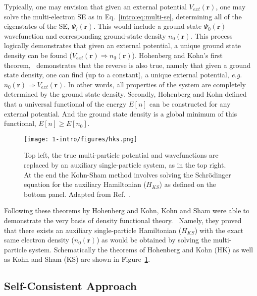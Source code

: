 Typically, one may envision that given an external potential $V_{ext}(\textbf{r})$, one may solve the multi-electron SE as in Eq.~\ref{intro:eq:multi-se}, determining all of the eigenstates of the SE, $\Psi_i({\textbf{r}})$. This would include a ground state $\Psi_0({\textbf{r}})$ wavefunction and corresponding ground-state density $n_0(\textbf{r})$. This process logically demonstrates that given an external potential, a unique ground state density can be found ($V_{ext}(\textbf{r})\Rightarrow n_0(\textbf{r})$). Hohenberg and Kohn's first theorem,~\cite{hohenberg1964inhomogeneous} demonstrates that the reverse is also true, namely that given a ground state density, one can find (up to a constant), a unique external potential, \textit{e.g.}\ $n_0(\textbf{r}) \Rightarrow V_{ext}(\textbf{r})$. In other words, all properties of the system are completely determined by the ground state density. Secondly, Hohenberg and Kohn defined that a universal functional of the energy $E[n]$ can be constructed for any external potential. And the ground state density is a global minimum of this functional, $E[n]\geq E[n_0]$.


\begin{figure}[h]
\begin{center}
\texttt{[image: 1-intro/figures/hks.png]}
    \caption{Top left, the true multi-particle potential and wavefunctions are replaced by an auxiliary single-particle system, as in the top right. At the end the Kohn-Sham method involves solving the Schr{\"o}dinger equation for the auxiliary Hamiltonian ($H_{KS}$) as defined on the bottom panel. Adapted from Ref.~\cite{martin2020electronic}.}  \label{intro:fig:hks}
\end{center}
\end{figure}

Following these theorems by Hohenberg and Kohn, Kohn and Sham were able to demonstrate the very basis of density functional theory.~\cite{kohn1965self} Namely, they proved that there exists an auxiliary single-particle Hamiltonian ($H_{KS}$) with the exact same electron density ($n_0(\textbf{r})$) as would be obtained by solving the multi-particle system. Schematically the theorems of Hohenberg and Kohn (HK) as well as Kohn and Sham (KS) are shown in Figure~\ref{intro:fig:hks}.

\subsection{Self-Consistent Approach}

